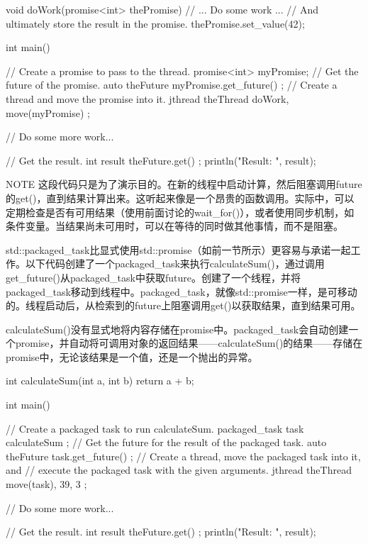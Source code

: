 \begin{cpp}
void doWork(promise<int> thePromise)
{
    // ... Do some work ...
    // And ultimately store the result in the promise.
    thePromise.set_value(42);
}

int main()
{
    // Create a promise to pass to the thread.
    promise<int> myPromise;
    // Get the future of the promise.
    auto theFuture { myPromise.get_future() };
    // Create a thread and move the promise into it.
    jthread theThread { doWork, move(myPromise) };

    // Do some more work...

    // Get the result.
    int result { theFuture.get() };
    println("Result: {}", result);
}
\end{cpp}

\begin{myNotic}{NOTE}
这段代码只是为了演示目的。在新的线程中启动计算，然后阻塞调用future的get()，直到结果计算出来。这听起来像是一个昂贵的函数调用。实际中，可以定期检查是否有可用结果（使用前面讨论的wait\_for()），或者使用同步机制，如条件变量。当结果尚未可用时，可以在等待的同时做其他事情，而不是阻塞。
\end{myNotic}


std::packaged\_task比显式使用std::promise（如前一节所示）更容易与承诺一起工作。以下代码创建了一个packaged\_task来执行calculateSum()，通过调用get\_future()从packaged\_task中获取future。创建了一个线程，并将packaged\_task移动到线程中。packaged\_task，就像std::promise一样，是可移动的。线程启动后，从检索到的future上阻塞调用get()以获取结果，直到结果可用。

calculateSum()没有显式地将内容存储在promise中。packaged\_task会自动创建一个promise，并自动将可调用对象的返回结果——calculateSum()的结果——存储在promise中，无论该结果是一个值，还是一个抛出的异常。

\begin{cpp}
int calculateSum(int a, int b) { return a + b; }

int main()
{
    // Create a packaged task to run calculateSum.
    packaged_task task { calculateSum };
    // Get the future for the result of the packaged task.
    auto theFuture { task.get_future() };
    // Create a thread, move the packaged task into it, and
    // execute the packaged task with the given arguments.
    jthread theThread { move(task), 39, 3 };

    // Do some more work...

    // Get the result.
    int result { theFuture.get() };
    println("Result: {}", result);
}
\end{cpp}

